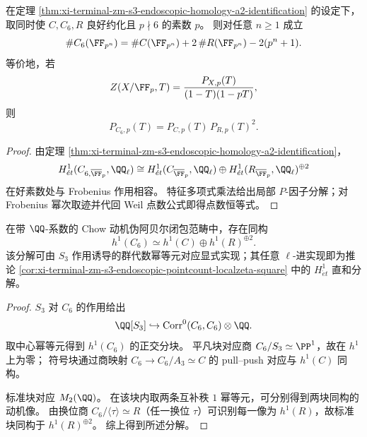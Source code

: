 \begin{corollary}\label{cor:xi-terminal-zm-s3-endoscopic-pointcount-localzeta-square}
在定理 \ref{thm:xi-terminal-zm-s3-endoscopic-homology-a2-identification} 的设定下，取同时使 \(C,C_6,R\) 良好约化且 \(p\nmid 6\) 的素数 \(p\)。
则对任意 \(n\ge 1\) 成立
\[
\#C_6(\FF_{p^n})
=\#C(\FF_{p^n})+2\,\#R(\FF_{p^n})-2(p^n+1).
\]
等价地，若
\[
Z(X/\FF_p,T)=\frac{P_{X,p}(T)}{(1-T)(1-pT)},
\]
则
\[
P_{C_6,p}(T)=P_{C,p}(T)\,P_{R,p}(T)^2.
\]
\end{corollary}
\begin{proof}
由定理 \ref{thm:xi-terminal-zm-s3-endoscopic-homology-a2-identification}，
\[
H^1_{\acute et}(C_{6,\overline{\FF}_p},\QQ_\ell)
\cong
H^1_{\acute et}(C_{\overline{\FF}_p},\QQ_\ell)
\oplus
H^1_{\acute et}(R_{\overline{\FF}_p},\QQ_\ell)^{\oplus2}
\]
在好素数处与 Frobenius 作用相容。
特征多项式乘法给出局部 \(P\)-因子分解；对 Frobenius 幂次取迹并代回 Weil 点数公式即得点数恒等式。
\end{proof}

\begin{theorem}\label{thm:xi-terminal-zm-s3-endoscopic-chow-motive-h1-splitting}
在带 \(\QQ\)-系数的 Chow 动机伪阿贝尔闭包范畴中，存在同构
\[
h^1(C_6)\simeq h^1(C)\oplus h^1(R)^{\oplus2}.
\]
该分解可由 \(S_3\) 作用诱导的群代数幂等元对应显式实现；其任意 \(\ell\)-进实现即为推论
\ref{cor:xi-terminal-zm-s3-endoscopic-pointcount-localzeta-square} 中的 \(H^1_{\acute et}\) 直和分解。
\end{theorem}
\begin{proof}
\(S_3\) 对 \(C_6\) 的作用给出
\[
\QQ[S_3]\hookrightarrow \mathrm{Corr}^0(C_6,C_6)\otimes\QQ.
\]
取中心幂等元得到 \(h^1(C_6)\) 的正交分块。
平凡块对应商 \(C_6/S_3\simeq\PP^1\)，故在 \(h^1\) 上为零；
符号块通过商映射 \(C_6\to C_6/A_3\simeq C\) 的 pull--push 对应与 \(h^1(C)\) 同构。

标准块对应 \(M_2(\QQ)\)。
在该块内取两条互补秩 \(1\) 幂等元，可分别得到两块同构的动机像。
由换位商 \(C_6/\langle\tau\rangle\simeq R\)（任一换位 \(\tau\)）可识别每一像为 \(h^1(R)\)，故标准块同构于 \(h^1(R)^{\oplus2}\)。
综上得到所述分解。
\end{proof}

